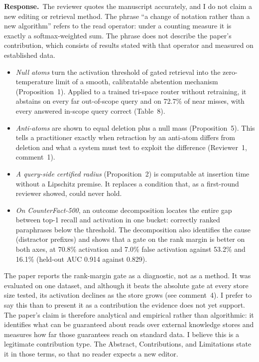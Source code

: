\documentclass[11pt]{article}
\newcommand{\response}{\par\noindent\textbf{Response.}\ }
\begin{document}
\response The reviewer quotes the manuscript accurately, and I do not claim a new editing or retrieval method. The phrase ``a change of notation rather than a new algorithm'' refers to the read operator: under a counting measure it is exactly a softmax-weighted sum. The phrase does not describe the paper's contribution, which consists of results stated with that operator and measured on established data.
\begin{itemize}
\item \emph{Null atoms} turn the activation threshold of gated retrieval into the zero-temperature limit of a smooth, calibratable abstention mechanism (Proposition~1). Applied to a trained tri-space router without retraining, it abstains on every far out-of-scope query and on 72.7\% of near misses, with every answered in-scope query correct (Table~8).
\item \emph{Anti-atoms} are shown to equal deletion plus a null mass (Proposition~5). This tells a practitioner exactly when retraction by an anti-atom differs from deletion and what a system must test to exploit the difference (Reviewer~1, comment~1).
\item \emph{A query-side certified radius} (Proposition~2) is computable at insertion time without a Lipschitz premise. It replaces a condition that, as a first-round reviewer showed, could never hold.
\item \emph{On CounterFact-500}, an outcome decomposition locates the entire gap between top-1 recall and activation in one bucket: correctly ranked paraphrases below the threshold. The decomposition also identifies the cause (distractor prefixes) and shows that a gate on the rank margin is better on both axes, at 70.8\% activation and 7.0\% false activation against 53.2\% and 16.1\% (held-out AUC 0.914 against 0.829).
\end{itemize}
The paper reports the rank-margin gate as a diagnostic, not as a method. It was evaluated on one dataset, and although it beats the absolute gate at every store size tested, its activation declines as the store grows (see comment~4). I prefer to say this than to present it as a contribution the evidence does not yet support. The paper's claim is therefore analytical and empirical rather than algorithmic: it identifies what can be guaranteed about reads over external knowledge stores and measures how far those guarantees reach on standard data. I believe this is a legitimate contribution type. The Abstract, Contributions, and Limitations state it in those terms, so that no reader expects a new editor.
\end{document}
